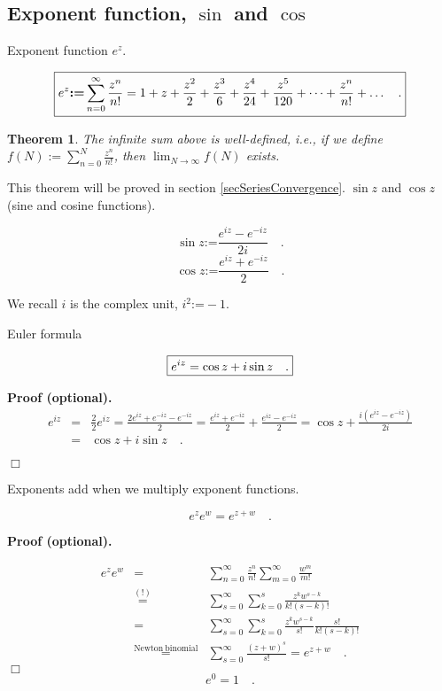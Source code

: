 \documentclass[12pt]{book}
\newcommand{\eqdef}{\textbf{:=}}
\newcommand{\eqAttention}{\stackrel{(!)}{=}}
\newcommand{\importantFormula}[1]{\begin{equation} \boxed{#1} \end{equation}}
\newenvironment{proofOptional}[1][]{ \textbf{Proof (optional).}}{$\Box$\medskip}
\newtheorem{theorem}{Theorem}[section]
\begin{document}
\subsection{Exponent function, $\sin$ and $\cos$}
 Exponent function $e^z$. 

\importantFormula{\label{eqExponentFunctionDefinition}
e^{z}\eqdef \sum_{n=0}^{\infty} \frac{z^n}{n!} = 1+z+\frac{z^{2}}{2}+\frac{z^3}{6}+\frac{z^4}{24}+\frac{z^5}{120}+\dots+\frac{z^n}{n!}+\dots \quad .
}

\begin{theorem} The infinite sum above is well-defined, i.e., if we define $f(N):=\sum_{n=0}^{N} \frac{z^n}{n!}$, then $\displaystyle\lim_{N\to \infty} f(N)$ exists.
\end{theorem}

This theorem will be proved in section \ref{secSeriesConvergence}.
  $\sin z$ and $\cos z$ (sine and cosine functions).

\importantFormula{
\sin z\eqdef \frac{e^{iz}-e^{-iz}}{2i} \quad .
}
\importantFormula{
\cos z\eqdef \frac{e^{iz}+e^{-iz}}{2}\quad .
}

We recall $i$ is the complex unit, $i^2\eqdef -1$.

Euler formula

\importantFormula{\label{eqEulerExp}
e^{iz}= \cos z+ i\sin z \quad .
}

\begin{proofOptional}
\[
\begin{array}{rcl}
e^{iz}&=& \frac{2}{2}e^{iz}= \frac{2e^{iz} + e^{-iz} - e^{-iz}}{2} = \frac{e^{iz}+e^{-iz}}2 +\frac{e^{iz}-e^{-iz}}2= \cos z + \frac{i(e^{iz}-e^{-iz})}{2i}\\&=& \cos z+i \sin z\quad .

\end{array}
\]

\end{proofOptional}


Exponents add when we multiply exponent functions.

\importantFormula{
e^{z} e^{w}=e^{z+w}\quad .
}

\begin{proofOptional}

\begin{equation*}
\begin{array}{rcl}
\displaystyle
e^{z} e^w&=&\sum_{n=0}^{\infty} \frac{z^n}{n!}\sum_{m=0}^{\infty} \frac{w^m}{m!} \\ &\eqAttention& \sum_{s=0}^{\infty}\sum_{k=0 }^s \frac{z^{k}w^{s-k}}{k! (s-k)!} \\ &=& \sum_{s=0}^{\infty}\sum_{k=0 }^s  \frac{z^{k}w^{s-k}}{s!}\frac{s!}{k! (s-k)!}\\ &\stackrel{\mathrm{Newton~binomial}}{=}&\sum_{s=0}^{\infty} \frac{(z+w)^s}{s!}=e^{z+w}\quad .
\end{array}
\end{equation*}
\end{proofOptional}
\[
e^0=1\quad .
\]
\end{document}
